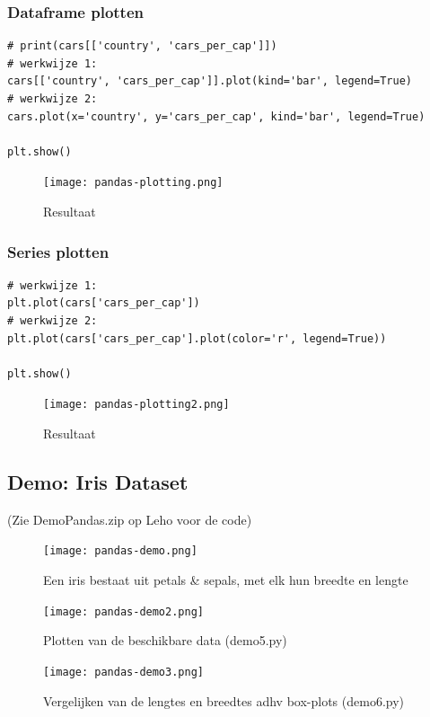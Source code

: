 \documentclass{article}
\begin{document}
\subsubsection{Dataframe plotten}

\begin{verbatim}
# print(cars[['country', 'cars_per_cap']])
# werkwijze 1:
cars[['country', 'cars_per_cap']].plot(kind='bar', legend=True)
# werkwijze 2:
cars.plot(x='country', y='cars_per_cap', kind='bar', legend=True)

plt.show()
\end{verbatim}

\begin{figure}[H]
    \centering
    \texttt{[image: pandas-plotting.png]}
    \caption{Resultaat}
\end{figure}

\subsubsection{Series plotten}

\begin{verbatim}
# werkwijze 1:
plt.plot(cars['cars_per_cap'])
# werkwijze 2:
plt.plot(cars['cars_per_cap'].plot(color='r', legend=True))

plt.show()
\end{verbatim}

\begin{figure}[H]
    \centering
    \texttt{[image: pandas-plotting2.png]}
    \caption{Resultaat}
\end{figure}

\subsection{Demo: Iris Dataset}

(Zie DemoPandas.zip op Leho voor de code)

\begin{figure}[H]
    \centering
    \texttt{[image: pandas-demo.png]}
    \caption{Een iris bestaat uit petals \& sepals, met elk hun breedte en lengte}
\end{figure}

\begin{figure}[H]
    \centering
    \texttt{[image: pandas-demo2.png]}
    \caption{Plotten van de beschikbare data (demo5.py)}
\end{figure}

\begin{figure}[H]
    \centering
    \texttt{[image: pandas-demo3.png]}
    \caption{Vergelijken van de lengtes en breedtes adhv box-plots (demo6.py)}
\end{figure}
\end{document}
